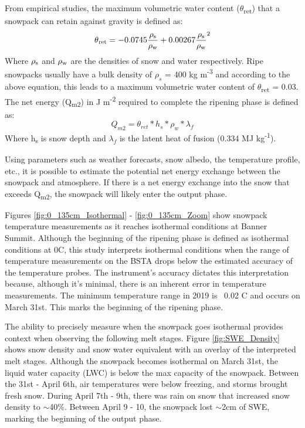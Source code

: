 From empirical studies, the maximum volumetric water content ($\theta$\textsubscript{ret}) that a snowpack can retain against gravity is defined as: 
\begin{equation}
\theta \textsubscript{ret} = -0.0745\frac{\rho \textsubscript{s}}{\rho \textsubscript{w}}
+ 0.00267\frac{\rho \textsubscript{s}}{\rho \textsubscript{w}}^2 
\end{equation}
Where $\rho \textsubscript{s}$ and $\rho \textsubscript{w}$ are the densities of snow and water respectively. Ripe snowpacks usually have a bulk density of $\rho_s$ = 400 kg m\textsuperscript{-3} and according to the above equation, this leads to a maximum volumetric water content of $\theta$\textsubscript{ret} = 0.03. The net energy (Q\textsubscript{m2}) in J m\textsuperscript{-2} required to complete the ripening phase is defined as: 
\begin{equation}
Q_{m2} = \theta_{ret} * h_s * \rho_w * \lambda_f
\end{equation}
Where h\textsubscript{s} is snow depth and $\lambda_f$ is the latent heat of fusion (0.334 MJ kg\textsuperscript{-1}). 

Using parameters such as weather forecasts, snow albedo, the temperature profile, etc., it is possible to estimate the potential net energy exchange between the snowpack and atmosphere. If there is a net energy exchange into the snow that exceeds Q\textsubscript{m2}, the snowpack will likely enter the output phase.  

Figures \ref{fig:0_135cm_Isothermal} - \ref{fig:0_135cm_Zoom} show snowpack temperature measurements as it reaches isothermal conditions at Banner Summit. Although the beginning of the ripening phase is defined as isothermal conditions at 0\textdegree C, this study interprets isothermal conditions when the range of temperature measurements on the BSTA drops below the estimated accuracy of the temperature probes. The instrument's accuracy dictates this interpretation because, although it's minimal, there is an inherent error in temperature measurements. The minimum temperature range in 2019 is ~0.02 C and occurs on March 31st. This marks the beginning of the ripening phase.

The ability to precisely measure when the snowpack goes isothermal provides context when observing the following melt stages. Figure \ref{fig:SWE_Density} shows snow density and snow water equivalent with an overlay of the interpreted melt stages. Although the snowpack becomes isothermal on March 31st, the liquid water capacity (LWC) is below the max capacity of the snowpack. Between the 31st - April 6th, air temperatures were below freezing, and storms brought fresh snow. During April 7th - 9th, there was rain on snow that increased snow density to $\sim$40\%. Between April 9 - 10, the snowpack lost $\sim$2cm of SWE, marking the beginning of the output phase.    


